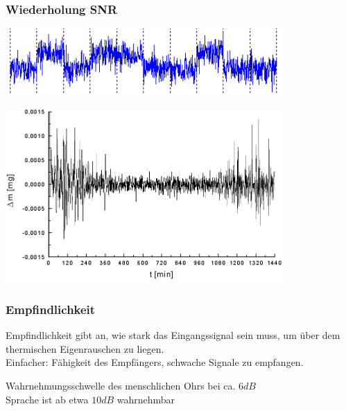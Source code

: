 \begin{frame}
    \frametitle{Wiederholung SNR}

    \begin{center}
        \includegraphics[width=0.8\textwidth,height=.4\textheight,keepaspectratio]{a18/Received_message.jpg}
        {\tiny \hyperlink{refs}{\cite{wm}}}
    \end{center}

    \begin{center}
    \includegraphics[width=0.8\textwidth,height=.4\textheight,keepaspectratio]{a18/Analyse_thermo_gravimetrique_bruit.png}
        {\tiny \hyperlink{refs}{\cite{wm}}}
    \end{center}

\end{frame}

\begin{frame}
    \frametitle{Empfindlichkeit}

    Empfindlichkeit gibt an, wie stark das Eingangssignal sein muss, um über
    dem thermischen Eigenrauschen zu liegen.\\[.5em]

    Einfacher: Fähigkeit des Empfängers, schwache Signale zu empfangen.

    \bigskip

    Wahrnehmungsschwelle des menschlichen Ohrs bei ca. $6 dB$\\
    Sprache ist ab etwa $10 dB$ wahrnehmbar

\end{frame}

